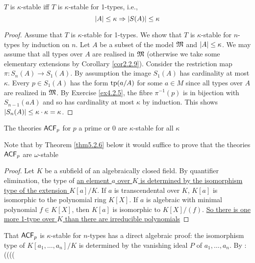 \documentclass[11pt]{article}
\begin{document}
\begin{lemma}[]
\label{lemma5.2.2}
\(T\) is \(\kappa\)-stable iff \(T\) is \(\kappa\)-stable for 1-types, i.e.,
\begin{equation*}
 \abs{A}\le\kappa\Rightarrow\abs{S(A)}\le\kappa
\end{equation*}
\end{lemma}

\begin{proof}
Assume that \(T\) is \(\kappa\)-stable for 1-types. We show that \(T\) is \(\kappa\)-stable for \(n\)-types by
induction on \(n\). Let \(A\) be a subset of the model \(\mathfrak{M}\) and \(\abs{A}\le\kappa\). We may assume
that all types over \(A\) are realised in \(\mathfrak{M}\) (otherwise we take some elementary extensions by
Corollary \ref{cor2.2.9}). Consider the restriction map \(\pi:S_n(A)\to S_1(A)\). By assumption the
image \(S_1(A)\) has cardinality at most \(\kappa\).
Every \(p\in S_1(A)\) has the form \(\operatorname{tp}(a/A)\) for some \(a\in M\) since all types over \(A\) are
realized in \(\mathfrak{M}\). By Exercise \ref{ex4.2.5}, the fibre \(\pi^{-1}(p)\) is in bijection
with \(S_{n-1}(aA)\) and so has cardinality at most \(\kappa\) by induction. This shows \(\abs{S_n(A)}\le\kappa\cdot\kappa=\kappa\).
\end{proof}

\begin{examplle}
The theories \(\textsf{ACF}_p\) for \(p\) a prime or 0 are \(\kappa\)-stable for all \(\kappa\)
\end{examplle}

Note that by Theorem \ref{thm5.2.6} below it would suffice to prove that the theories \(\textsf{ACF}_p\)
are \(\omega\)-stable

\begin{proof}
\label{Problem1}
Let \(K\) be a subfield of an algebraically closed field. By quantifier elimination, the type of
\uline{an element \(a\) over \(K\) is determined by the isomorphism type of the extension \(K[a]/K\)}.
If \(a\) is transcendental over \(K\), \(K[a]\) is isomorphic to the polynomial ring \(K[X]\).
If \(a\) is algebraic with minimal polynomial \(f\in K[X]\), then \(K[a]\) is isomorphic
to \(K[X]/(f)\). \uline{So there is one more 1-type over \(K\) than there are irreducible polynomials}
\end{proof}

That \(\textsf{ACF}_p\) is \(\kappa\)-stable for \(n\)-types has a direct algebraic proof: the isomorphism type
of \(K[a_1,\dots,a_n]/K\) is determined by the vanishing ideal \(P\) of \(a_1,\dots,a_n\). By :((((
\end{document}
